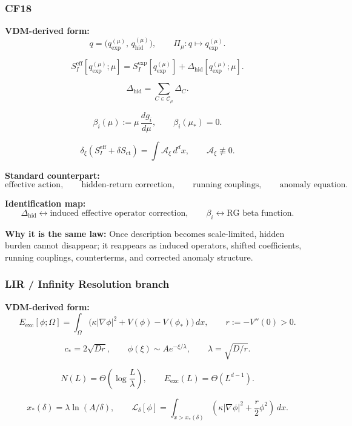 \documentclass[11pt]{article}
\theoremstyle{definition}
\theoremstyle{plain}
\theoremstyle{remark}
\begin{document}

\subsubsection*{CF18}
\textbf{VDM-derived form:}
\[
q = \bigl(q_{\mathrm{exp}}^{(\mu)},\,q_{\mathrm{hid}}^{(\mu)}\bigr),
\qquad
\Pi_\mu:q\mapsto q_{\mathrm{exp}}^{(\mu)}.
\]

\[
S_I^{\mathrm{eff}}\!\left[q_{\mathrm{exp}}^{(\mu)};\mu\right]
=
S_I^{\mathrm{exp}}\!\left[q_{\mathrm{exp}}^{(\mu)}\right]
+
\Delta_{\mathrm{hid}}\!\left[q_{\mathrm{exp}}^{(\mu)};\mu\right].
\]

\[
\Delta_{\mathrm{hid}}
=
\sum_{C\in\mathcal C_\mu}\Delta_C.
\]

\[
\beta_i(\mu):=\mu\,\frac{dg_i}{d\mu},
\qquad
\beta_i(\mu_\ast)=0.
\]

\[
\delta_\xi\!\left(S_I^{\mathrm{eff}}+\delta S_{\mathrm{ct}}\right)
=
\int \mathcal A_\xi\,d^dx,
\qquad
\mathcal A_\xi\not\equiv 0.
\]

\textbf{Standard counterpart:}
\[
\text{effective action},
\qquad
\text{hidden-return correction},
\qquad
\text{running couplings},
\qquad
\text{anomaly equation}.
\]

\textbf{Identification map:}
\[
\Delta_{\mathrm{hid}}
\leftrightarrow
\text{induced effective operator correction},
\qquad
\beta_i \leftrightarrow \text{RG beta function}.
\]

\textbf{Why it is the same law:} Once description becomes scale-limited, hidden
burden cannot disappear; it reappears as induced operators, shifted
coefficients, running couplings, counterterms, and corrected anomaly structure.


\subsubsection*{LIR / Infinity Resolution branch}
\textbf{VDM-derived form:}
\[
E_{\mathrm{exc}}[\phi;\Omega]
=
\int_\Omega
\bigl(
\kappa|\nabla\phi|^2 + V(\phi)-V(\phi_\ast)
\bigr)\,dx,
\qquad
r:=-V''(0)>0.
\]

\[
c_\ast = 2\sqrt{Dr},
\qquad
\phi(\xi)\sim A e^{-\xi/\lambda},
\qquad
\lambda=\sqrt{D/r}.
\]

\[
N(L)=\Theta\!\left(\log\frac{L}{\lambda}\right),
\qquad
E_{\mathrm{exc}}(L)=\Theta(L^{d-1}).
\]

\[
x_\ast(\delta)=\lambda\ln(A/\delta),
\qquad
\mathcal L_\delta[\phi]
=
\int_{x>x_\ast(\delta)}
\left(
\kappa|\nabla\phi|^2+\frac{r}{2}\phi^2
\right)\,dx.
\]
\end{document}

